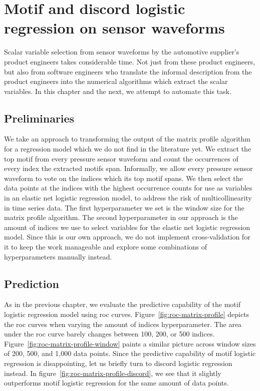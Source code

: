 \chapter{Motif and discord logistic regression on sensor waveforms}

Scalar variable selection from sensor waveforms by the automotive supplier's product engineers takes considerable time.
Not just from these product engineers, but also from software engineers who translate the informal description from the product engineers into the numerical algorithms which extract the scalar variables.
In this chapter and the next, we attempt to automate this task.

\section{Preliminaries}

We take an approach to transforming the output of the matrix profile algorithm for a regression model which we do not find in the literature yet.
We extract the top motif from every pressure sensor waveform and count the occurrences of every index the extracted motifs span.
Informally, we allow every pressure sensor waveform to vote on the indices which its top motif spans.
We then select the data points at the indices with the highest occurrence counts for use as variables in an elastic net logistic regression model, to address the risk of multicollinearity in time series data.
The first hyperparameter we set is the window size for the matrix profile algorithm.
The second hyperparameter in our approach is the amount of indices we use to select variables for the elastic net logistic regression model.
Since this is our own approach, we do not implement cross-validation for it to keep the work manageable and explore some combinations of hyperparameters manually instead.

\section{Prediction}

As in the previous chapter, we evaluate the predictive capability of the motif logistic regression model using \acrshort{roc} curves.
Figure~\ref{fig:roc-matrix-profile} depicts the \acrshort{roc} curves when varying the amount of indices hyperparameter.
The area under the \acrshort{roc} curve barely changes between 100, 200, or 500 indices.
Figure~\ref{fig:roc-matrix-profile-window} paints a similar picture across window sizes of 200, 500, and 1,000 data points.
Since the predictive capability of motif logistic regression is disappointing, let us briefly turn to discord logistic regression instead.
In figure~\ref{fig:roc-matrix-profile-discord}, we see that it slightly outperforms motif logistic regression for the same amount of data points.

